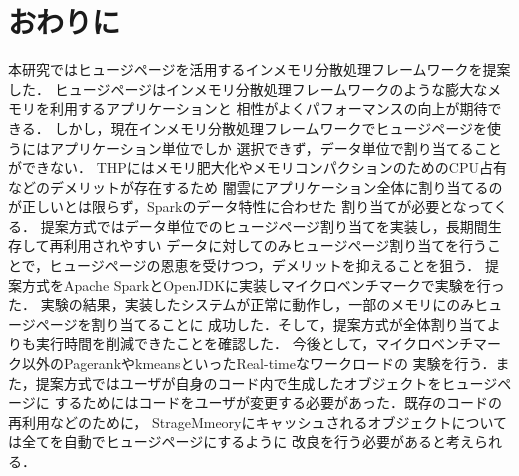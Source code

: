 \section{おわりに} \label{section:conclusion}
本研究ではヒュージページを活用するインメモリ分散処理フレームワークを提案した．
ヒュージページはインメモリ分散処理フレームワークのような膨大なメモリを利用するアプリケーションと
相性がよくパフォーマンスの向上が期待できる．
しかし，現在インメモリ分散処理フレームワークでヒュージページを使うにはアプリケーション単位でしか
選択できず，データ単位で割り当てることができない．
THPにはメモリ肥大化やメモリコンパクションのためのCPU占有などのデメリットが存在するため
闇雲にアプリケーション全体に割り当てるのが正しいとは限らず，Sparkのデータ特性に合わせた
割り当てが必要となってくる．
提案方式ではデータ単位でのヒュージページ割り当てを実装し，長期間生存して再利用されやすい
データに対してのみヒュージページ割り当てを行うことで，ヒュージページの恩恵を受けつつ，デメリットを抑えることを狙う．
提案方式をApache SparkとOpenJDKに実装しマイクロベンチマークで実験を行った．
実験の結果，実装したシステムが正常に動作し，一部のメモリにのみヒュージページを割り当てることに
成功した．そして，提案方式が全体割り当てよりも実行時間を削減できたことを確認した．
今後として，マイクロベンチマーク以外のPagerank\cite{page1999pagerank}やkmeansといったReal-timeなワークロードの
実験を行う．また，提案方式ではユーザが自身のコード内で生成したオブジェクトをヒュージページに
するためにはコードをユーザが変更する必要があった．既存のコードの再利用などのために，
StrageMmeoryにキャッシュされるオブジェクトについては全てを自動でヒュージページにするように
改良を行う必要があると考えられる．


